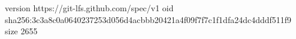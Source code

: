 version https://git-lfs.github.com/spec/v1
oid sha256:3c3a8c0a0640237253d056d4acbbb20421a4f09f7f7c1f1dfa24dc4dddf511f9
size 2655
